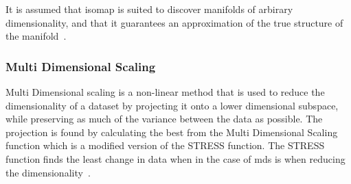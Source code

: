 It is assumed that \gls{isomap} is suited to discover manifolds of arbirary dimensionality, and that it guarantees an approximation of the true structure of the manifold~\cite{tennenbaum}.


\subsubsection{Multi Dimensional Scaling}\label{subsubsec:multi-dimensional-scaling}
Multi Dimensional scaling is a non-linear method that is used to reduce the dimensionality of a dataset by projecting it onto a lower dimensional subspace, while preserving as much of the variance between the data as possible. The projection is found by calculating the best from the Multi Dimensional Scaling function which is a modified version of the STRESS function. The STRESS function finds the least change in data when in the case of \gls{mds} is when reducing the dimensionality~\cite{multi-dimensional-scaling-leeuw}.








